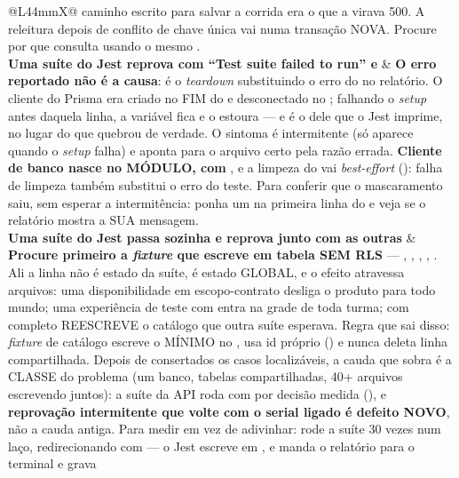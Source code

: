 \begin{tabularx}{\linewidth}{@{}L{44mm}X@{}}
  caminho escrito para salvar a corrida era o que a virava 500. A releitura
  depois de conflito de chave única vai numa transação NOVA. Procure por
   que consulta usando o mesmo .\\
\textbf{Uma suíte do Jest reprova com \enquote{Test suite failed to run} e
} &
  \textbf{O erro reportado não é a causa}: é o \emph{teardown} substituindo o
  erro do  no relatório. O cliente do Prisma era criado no FIM do
   e desconectado no ; falhando o \emph{setup}
  antes daquela linha, a variável fica  e o 
  estoura --- e é o  dele que o Jest imprime, no lugar do que
  quebrou de verdade. O sintoma é intermitente (só aparece quando o
  \emph{setup} falha) e aponta para o arquivo certo pela razão errada.
  \textbf{Cliente de banco nasce no MÓDULO, com }, e a limpeza do
   vai \emph{best-effort} (): falha
  de limpeza também substitui o erro do teste. Para conferir que o mascaramento
  saiu, sem esperar a intermitência: ponha um  na primeira linha do
   e veja se o relatório mostra a SUA mensagem.\\
\zebra \textbf{Uma suíte do Jest passa sozinha e reprova junto com as outras} &
  \textbf{Procure primeiro a \emph{fixture} que escreve em tabela SEM RLS} ---
  , , ,
  , . Ali a linha não é estado da
  suíte, é estado GLOBAL, e o efeito atravessa arquivos: uma disponibilidade em
  escopo-contrato desliga o produto para todo mundo; uma experiência de teste com
   entra na grade de toda turma;  com
   completo REESCREVE o catálogo que outra suíte esperava. Regra que
  sai disso: \emph{fixture} de catálogo escreve o MÍNIMO no , usa id
  próprio () e nunca deleta linha compartilhada. Depois de
  consertados os casos localizáveis, a cauda que sobra é a CLASSE do problema
  (um banco, tabelas compartilhadas, 40+ arquivos escrevendo juntos): a suíte da
  API roda com  por decisão medida (), e
  \textbf{reprovação intermitente que volte com o serial ligado é defeito NOVO},
  não a cauda antiga. Para medir em vez de adivinhar: rode a suíte 30 vezes num
  laço, redirecionando com  --- o Jest escreve em
  , e  manda o relatório para o terminal e grava

\end{tabularx}
